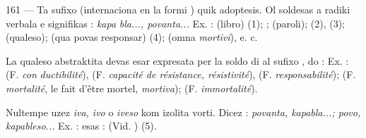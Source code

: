 \begin{VUpage}[165]{161}
 --- Ta sufixo (internaciona en la formi ) quik\nl
adoptesis. Ol soldesas a radiki verbala e signifikas : \textit{kapa}\cc
\textit{bla..., povanta...} Ex. :  (libro) (1); \cc
{};  (paroli);  (2),  (3);\nl
{} (qualeso);  (qua povas responsar) (4);\nl
{} (omna \textit{mortivi}), e. c.

La qualeso abstraktita devas esar expresata per la soldo\nl
di  al sufixo , do :  Ex. :  (F. \textit{con}\cc
\textit{ductibilité}),  (F. \textit{capacité de résistance, résistivité}),\nl
{} (F. \textit{responsabilité});  (F. \textit{mortalité}, le\nl
fait d'être mortel, \textit{mortiva});  (F. \textit{immortalité}).\parplein

Nultempe uzez \textit{iva, ivo} o \textit{iveso} kom izolita vorti. Dicez :\nl
\textit{povanta, kapabla...; povo, kapableso...} Ex. : \cc
{} esas :  (Vid. ) (5).
\end{VUpage}

